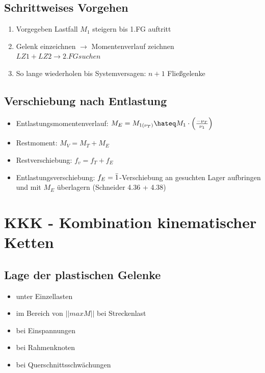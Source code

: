 \documentclass[fleqn,twoside]{article}
\newcommand{\abs}[1]{\ensuremath{\left\vert#1\right\vert}}
\begin{document}
    \subsection{Schrittweises Vorgehen}
        \begin{enumerate}
            \item Vorgegeben Lastfall $M_1$ steigern bis 1.FG auftritt
            \item Gelenk einzeichnen $\rightarrow$ Momentenverlauf zeichnen\\
                    $LZ1+LZ2 \rightarrow 2.FG suchen$
            \item So lange wiederholen bis Systemversagen: $n+1$ Fließgelenke
        \end{enumerate}

    \subsection{Verschiebung nach Entlastung} 
        \begin{itemize}
            \item Entlastungsmomentenverlauf: $M_E = M_{1(\nu_T)} \hateq M_1 \cdot \left( \frac{-\nu_T}{\nu_1} \right) $
            \item Restmoment: $M_V = M_T + M_E $
            \item Restverschiebung: $ f_v = f_T + f_E $
            \item Entlastungsverschiebung: $ f_E = \Bar{1}$-Verschiebung an gesuchten Lager aufbringen und mit $M_E$ überlagern (Schneider 4.36 + 4.38)
        \end{itemize}
        
\section{KKK - Kombination kinematischer Ketten}

    \subsection{Lage der plastischen Gelenke}
        \begin{itemize}
            \item unter Einzellasten
            \item im Bereich von $\abs{\abs{maxM}}$ bei Streckenlast
            \item bei Einspannungen
            \item bei Rahmenknoten
            \item bei Querschnittsschwächungen
        \end{itemize}
\end{document}
